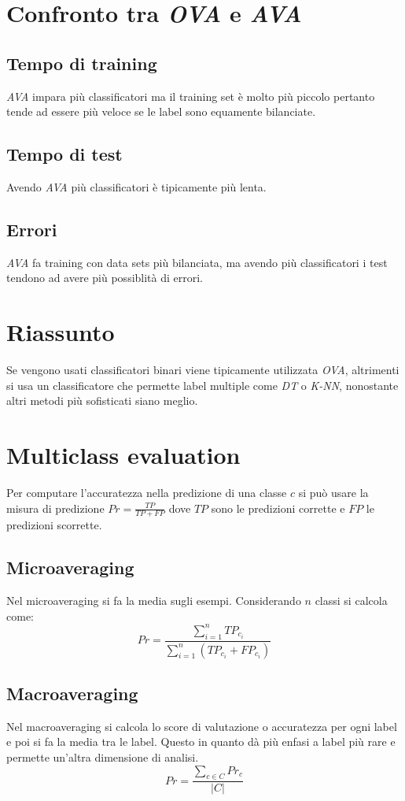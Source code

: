 \section{Confronto tra \emph{OVA} e \emph{AVA}}

	\subsection{Tempo di training}
	\emph{AVA} impara pi\`u classificatori ma il training set \`e molto pi\`u piccolo pertanto tende ad essere pi\`u veloce se le label sono equamente bilanciate.

	\subsection{Tempo di test}
	Avendo \emph{AVA} pi\`u classificatori \`e tipicamente pi\`u lenta.

	\subsection{Errori}
	\emph{AVA} fa training con data sets pi\`u bilanciata, ma avendo pi\`u classificatori i test tendono ad avere pi\`u possiblit\`a di errori.

\section{Riassunto}
Se vengono usati classificatori binari viene tipicamente utilizzata  \emph{OVA}, altrimenti si usa un classificatore che permette label multiple come \emph{DT} o \emph{K-NN}, nonostante altri metodi pi\`u sofisticati siano meglio.

\section{Multiclass evaluation}
Per computare l'accuratezza nella predizione di una classe $c$ si pu\`o usare la misura di predizione $Pr=\frac{TP}{TP+FP}$ dove $TP$ sono le predizioni corrette e $FP$ le predizioni scorrette.

	\subsection{Microaveraging}
	Nel microaveraging si fa la media sugli esempi.
	Considerando $n$ classi si calcola come:
	$$Pr=\dfrac{\sum\limits_{i=1}^nTP_{c_i}}{\sum\limits_{i=1}^n(TP_{c_i}+FP_{c_i})}$$

	\subsection{Macroaveraging}
	Nel macroaveraging si calcola lo score di valutazione o accuratezza per ogni label e poi si fa la media tra le label.
	Questo in quanto d\`a pi\`u enfasi a label pi\`u rare e permette un'altra dimensione di analisi.
	$$Pr=\dfrac{\sum\limits_{c\in C}Pr_c}{|C|}$$

